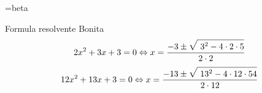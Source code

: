 \font\MyFont=beta
\def\b{{\MyFont B}}

\def\formres(#1,#2,#3){$$
	#1x^2+#2x+3=0 \Leftrightarrow
	x={-#2\pm
		\raise 1.em\hbox{$\sqrt{\lower 1.em\hbox{
			$#2^2-4\cdot#1\cdot#3$}}$}\over 2\cdot#1}
$$}

Formula resolvente \b onita
\formres(2,3,5)
\formres(12,13,54)

\bye
